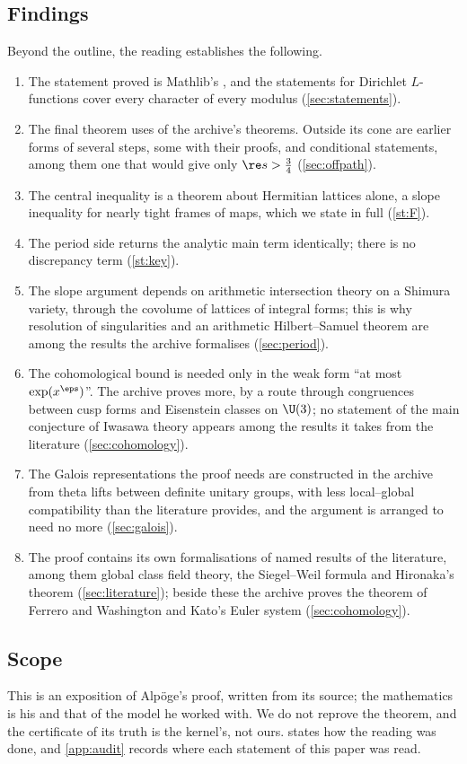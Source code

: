 \subsection{Findings}
Beyond the outline, the reading establishes the following.
\begin{enumerate}[label=(\roman*)]
\item The statement proved is Mathlib's , and the statements for
  Dirichlet $L$-functions cover every character of every modulus (\cref{sec:statements}).
\item The final theorem uses \coneprojtheorems{} of the archive's \projtheorems{} theorems.
  Outside its cone are earlier forms of several steps, some with their proofs, and conditional
  statements, among them one that would give only $\re s>\tfrac34$ (\cref{sec:offpath}).
\item The central inequality is a theorem about Hermitian lattices alone, a slope inequality
  for nearly tight frames of maps, which we state in full (\cref{st:F}).
\item The period side returns the analytic main term identically; there is no discrepancy term
  (\cref{st:key}).
\item The slope argument depends on arithmetic intersection theory on a Shimura variety,
  through the covolume of lattices of integral forms; this is why resolution of singularities
  and an arithmetic Hilbert--Samuel theorem are among the results the archive formalises
  (\cref{sec:period}).
\item The cohomological bound is needed only in the weak form ``at most $\exp(x^\eps)$''. The
  archive proves more, by a route through congruences between cusp forms and Eisenstein
  classes on $\U(3)$; no statement of the main conjecture of Iwasawa theory appears among the
  results it takes from the literature (\cref{sec:cohomology}).
\item The Galois representations the proof needs are constructed in the archive from theta
  lifts between definite unitary groups, with less local--global compatibility than the
  literature provides, and the argument is arranged to need no more (\cref{sec:galois}).
\item The proof contains its own formalisations of \rowspublished{} named results of the
  literature, among them global class field theory, the Siegel--Weil formula and Hironaka's
  theorem (\cref{sec:literature}); beside these the archive proves the theorem of Ferrero and
  Washington and Kato's Euler system (\cref{sec:cohomology}).
\end{enumerate}

\subsection{Scope}
This is an exposition of Alp\"oge's proof, written from its source; the mathematics is his and
that of the model he worked with. We do not reprove the theorem, and the certificate of its
truth is the kernel's, not ours.  states how the reading was done, and
\cref{app:audit} records where each statement of this paper was read.

